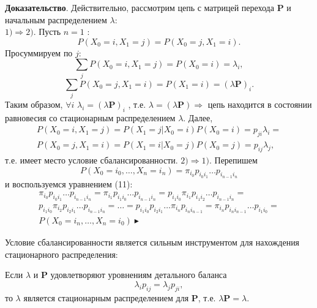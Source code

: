 \documentclass[14pt,a4paper]{article}
\begin{document}
\textbf{Доказательство}. Действительно, рассмотрим цепь с матрицей перехода $\mathbf{P}$ и начальным распределением $\lambda$:\\
$1) \Rightarrow 2)$. Пусть $n = 1$ :
\begin{equation}
    P(X_0 = i, X_1 = j) = P(X_0 = j, X_1 = i).
\end{equation}
Просуммируем по $j$:
\begin{equation}
    \sum_j P(X_0 = i, X_1 = j) = P(X_0 = i) = \lambda_i,
\end{equation}
\begin{equation}
    \sum_j P(X_0 = j, X_1 = i) = P(X_1 = i) = (\lambda \mathbf{P})_i.
\end{equation}
Таким образом, $\forall i$ $\lambda_i = (\lambda \mathbf{P})_i$ , т.е. $\lambda = (\lambda \mathbf{P} ) \Rightarrow $ цепь находится в состоянии равновесия со стационарным распределением $\lambda$. Далее,
\begin{equation}\begin{gathered}
    P(X_0 = i, X_1 = j) = P(X_1 = j | X_0 = i) P(X_0 = i) = p_{j i}\lambda_i = \\P(X_0 = j, X_1 = i) = P(X_1 = i | X_0 = j) P(X_0 = j) = p_{i j}\lambda_j,
\end{gathered}\end{equation}
т.е. имеет место условие сбалансированности.
$2) \Rightarrow 1)$. Перепишем
\begin{equation}
    P(X_0 = i_0, \dots, X_n = i_n) = \pi_{i_0}p_{i_0 i_1}\dots p_{i_{n-1} i_n}
\end{equation}
и воспользуемся уравнением (11):
\begin{equation}\begin{gathered}
    \pi_{i_0}p_{i_0 i_1}\dots p_{i_{n-1} i_n} = \pi_{i_1}p_{i_1 i_0}\dots p_{i_{n-1} i_n} = p_{i_1 i_0}\pi_{i_1}p_{i_1 i_2}\dots p_{i_{n-1} i_n} = \\p_{i_1 i_0}\pi_{i_2}p_{i_2 i_1}\dots p_{i_{n-1} i_n} = \dots = p_{i_1 i_0}p_{i_2 i_1}\dots \pi_{i_n}p_{i_n i_{n-1}} = \pi_{i_n} p_{i_n i_{n-1}}\dots p_{i_1 i_0} = \\P(X_0 = i_n, \dots, X_n = i_0) \blacktriangleright
\end{gathered}\end{equation}


Условие сбалансированности является сильным инструментом для нахождения стационарного распределения:

\begin{Th} Если $\lambda$ и $\mathbf{P}$ удовлетворяют уровнениям детального баланса
\begin{equation}
   \lambda_i p_{i j} = \lambda_j p_{j i},
\end{equation}
то $\lambda$ является стационарным распределением для $\mathbf{P}$, т.е. $\lambda \mathbf{P} = \lambda$.
\end{Th}
\end{document}
